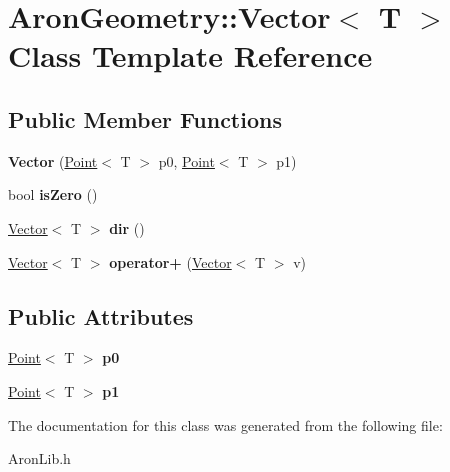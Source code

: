 \hypertarget{class_aron_geometry_1_1_vector}{}\section{Aron\+Geometry\+:\+:Vector$<$ T $>$ Class Template Reference}
\label{class_aron_geometry_1_1_vector}
\subsection*{Public Member Functions}
\begin{DoxyCompactItemize}
\item 
\mbox{\label{class_aron_geometry_1_1_vector_ab0e5b0897f0b69f40394e210fa0fa7b1}} 
{\bfseries Vector} (\mbox{\hyperlink{class_aron_geometry_1_1_point}{Point}}$<$ T $>$ p0, \mbox{\hyperlink{class_aron_geometry_1_1_point}{Point}}$<$ T $>$ p1)
\item 
\mbox{\label{class_aron_geometry_1_1_vector_ac1e4622aaf8e4c4f043a0ddbb1c105e3}} 
bool {\bfseries is\+Zero} ()
\item 
\mbox{\label{class_aron_geometry_1_1_vector_a4f32e0511426c8430af6b7d871931540}} 
\mbox{\hyperlink{class_aron_geometry_1_1_vector}{Vector}}$<$ T $>$ {\bfseries dir} ()
\item 
\mbox{\label{class_aron_geometry_1_1_vector_adcca2e5f2b022cf628c894bf65667bae}} 
\mbox{\hyperlink{class_aron_geometry_1_1_vector}{Vector}}$<$ T $>$ {\bfseries operator+} (\mbox{\hyperlink{class_aron_geometry_1_1_vector}{Vector}}$<$ T $>$ v)
\end{DoxyCompactItemize}
\subsection*{Public Attributes}
\begin{DoxyCompactItemize}
\item 
\mbox{\label{class_aron_geometry_1_1_vector_a08859640da0f641d014f8985967f4fe4}} 
\mbox{\hyperlink{class_aron_geometry_1_1_point}{Point}}$<$ T $>$ {\bfseries p0}
\item 
\mbox{\label{class_aron_geometry_1_1_vector_a6f684e39725485dadce39a402b5ef248}} 
\mbox{\hyperlink{class_aron_geometry_1_1_point}{Point}}$<$ T $>$ {\bfseries p1}
\end{DoxyCompactItemize}


The documentation for this class was generated from the following file\+:\begin{DoxyCompactItemize}
\item 
Aron\+Lib.\+h\end{DoxyCompactItemize}
